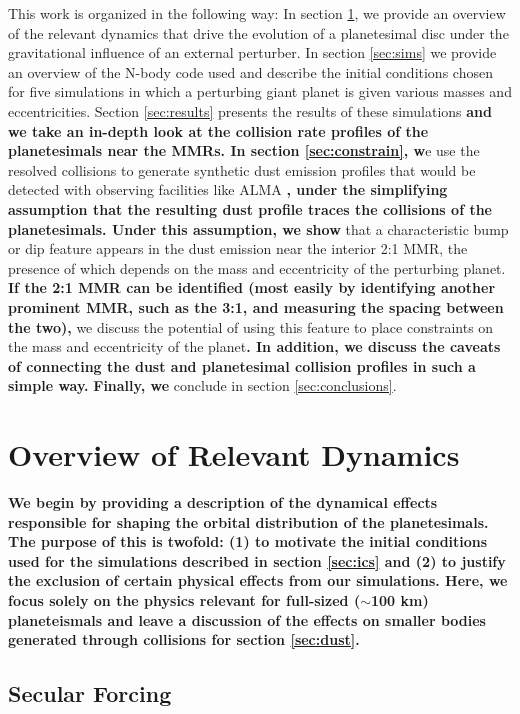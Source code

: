 \documentclass[fleqn,usenatbib]{mnras}
\begin{document}
This work is organized in the following way: In section \ref{sec:dynamics}, we provide an overview of the relevant dynamics that drive the evolution 
of a planetesimal disc under the gravitational influence of an external perturber. In section \ref{sec:sims} we provide an overview of the N-body code 
used and describe the initial conditions chosen for five simulations in which a perturbing giant planet is given various masses 
and eccentricities. Section \ref{sec:results} presents the results of these simulations \textbf{and we take an in-depth look at the collision rate profiles of the planetesimals near the MMRs. In section \ref{sec:constrain}, w}e use the resolved collisions to generate synthetic dust 
emission profiles that would be detected with observing facilities like ALMA \textbf{, under the simplifying assumption that the resulting dust profile traces the collisions of the planetesimals. Under this assumption, we show} that a characteristic bump 
or dip feature appears in the dust emission near the interior 2:1 MMR, the presence of which depends on the mass and eccentricity of the perturbing 
planet. \textbf{If the 2:1 MMR can be identified (most easily by identifying another prominent MMR, such as the 3:1, and measuring the spacing between the two),} we discuss the potential of using this feature to place constraints on the mass and eccentricity of the planet\textbf{. In addition, we discuss the caveats of connecting the dust and planetesimal collision profiles in such a simple way.} \textbf{Finally, we} conclude in section 
\ref{sec:conclusions}.

\section{Overview of Relevant Dynamics} \label{sec:dynamics}

\textbf{We begin by providing a description of the dynamical effects responsible for shaping the orbital distribution of the planetesimals. The purpose of this is twofold: (1) to motivate the initial conditions used for the simulations described in section \ref{sec:ics} and (2) to justify the exclusion of certain physical effects from our simulations. Here, we focus solely on the physics relevant for full-sized ($\sim$100 km) planeteismals and leave a discussion of the effects on smaller bodies generated through collisions for section \ref{sec:dust}.}

\subsection{Secular Forcing}\label{sec:sec_force}
\end{document}
